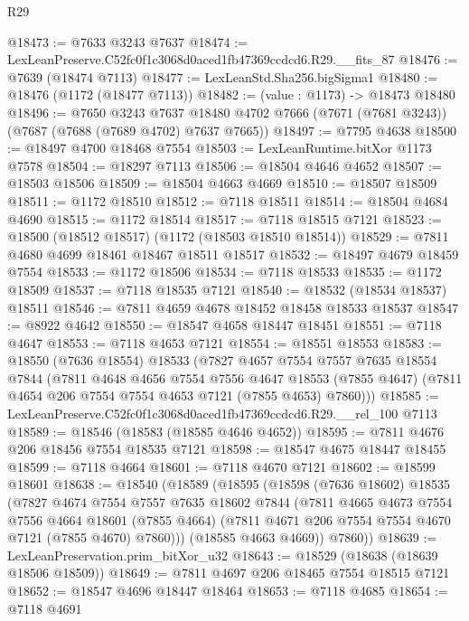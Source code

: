 \begin{lexlean}{R29}
\begin{coremodule}
@18473 := @7633 @3243 @7637
@18474 := LexLeanPreserve.C52fc0f1c3068d0aced1fb47369ccdcd6.R29.__fits_87
@18476 := @7639 (@18474 @7113)
@18477 := LexLeanStd.Sha256.bigSigma1
@18480 := @18476 (@1172 (@18477 @7113))
@18482 := (value : @1173) -> @18473 @18480
@18496 := @7650
    @3243
    @7637
    @18480
    @4702
    @7666
    (@7671 (@7681 @3243))
    (@7687 (@7688 (@7689 @4702) @7637 @7665))
@18497 := @7795 @4638
@18500 := @18497 @4700 @18468 @7554
@18503 := LexLeanRuntime.bitXor @1173 @7578
@18504 := @18297 @7113
@18506 := @18504 @4646 @4652
@18507 := @18503 @18506
@18509 := @18504 @4663 @4669
@18510 := @18507 @18509
@18511 := @1172 @18510
@18512 := @7118 @18511
@18514 := @18504 @4684 @4690
@18515 := @1172 @18514
@18517 := @7118 @18515 @7121
@18523 := @18500 (@18512 @18517) (@1172 (@18503 @18510 @18514))
@18529 := @7811 @4680 @4699 @18461 @18467 @18511 @18517
@18532 := @18497 @4679 @18459 @7554
@18533 := @1172 @18506
@18534 := @7118 @18533
@18535 := @1172 @18509
@18537 := @7118 @18535 @7121
@18540 := @18532 (@18534 @18537) @18511
@18546 := @7811 @4659 @4678 @18452 @18458 @18533 @18537
@18547 := @8922 @4642
@18550 := @18547 @4658 @18447 @18451
@18551 := @7118 @4647
@18553 := @7118 @4653 @7121
@18554 := @18551 @18553
@18583 := @18550
    (@7636 @18554)
    @18533
    (@7827
      @4657
      @7554
      @7557
      @7635
      @18554
      @7844
      (@7811
        @4648
        @4656
        @7554
        @7556
        @4647
        @18553
        (@7855 @4647)
        (@7811 @4654 @206 @7554 @7554 @4653 @7121 (@7855 @4653) @7860)))
@18585 := LexLeanPreserve.C52fc0f1c3068d0aced1fb47369ccdcd6.R29.__rel_100 @7113
@18589 := @18546 (@18583 (@18585 @4646 @4652))
@18595 := @7811 @4676 @206 @18456 @7554 @18535 @7121
@18598 := @18547 @4675 @18447 @18455
@18599 := @7118 @4664
@18601 := @7118 @4670 @7121
@18602 := @18599 @18601
@18638 := @18540
    (@18589
      (@18595
        (@18598
          (@7636 @18602)
          @18535
          (@7827
            @4674
            @7554
            @7557
            @7635
            @18602
            @7844
            (@7811
              @4665
              @4673
              @7554
              @7556
              @4664
              @18601
              (@7855 @4664)
              (@7811 @4671 @206 @7554 @7554 @4670 @7121 (@7855 @4670) @7860)))
          (@18585 @4663 @4669))
        @7860))
@18639 := LexLeanPreservation.prim_bitXor_u32
@18643 := @18529 (@18638 (@18639 @18506 @18509))
@18649 := @7811 @4697 @206 @18465 @7554 @18515 @7121
@18652 := @18547 @4696 @18447 @18464
@18653 := @7118 @4685
@18654 := @7118 @4691

\end{coremodule}
\end{lexlean}

